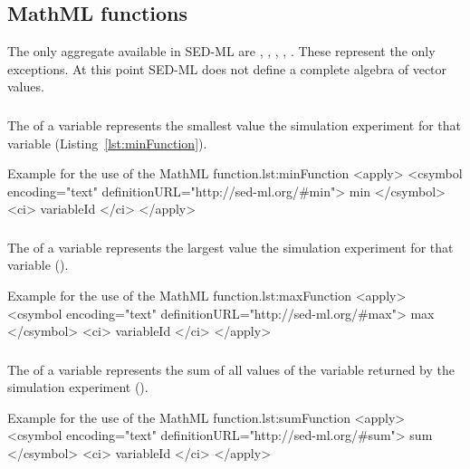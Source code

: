 \subsection{MathML functions}
The only aggregate  available in SED-ML are \sedmin, \sedmax, \sedsum, \product, . These represent the only exceptions. At this point SED-ML does not define a complete algebra of vector values.

\subsubsection*{}
\label{fun:min}
The  of a variable represents the smallest value the simulation experiment for that variable (Listing~\ref{lst:minFunction}). 
\begin{myXmlLst}{Example for the use of the MathML  function.}{lst:minFunction}
<apply>
 	<csymbol encoding="text" definitionURL="http://sed-ml.org/#min">
 		min
 	</csymbol>
 	<ci> variableId </ci>
</apply>
\end{myXmlLst}

\subsubsection*{}
\label{fun:max}
The  of a variable represents the largest value the simulation experiment for that variable ().
\begin{myXmlLst}{Example for the use of the MathML  function.}{lst:maxFunction}
<apply>
 	<csymbol encoding="text" definitionURL="http://sed-ml.org/#max">
 		max
 	</csymbol>
 	<ci> variableId </ci>
</apply>
\end{myXmlLst}

\subsubsection*{}
\label{fun:sum}
The  of a variable represents the sum of all values of the variable returned by the simulation experiment ().
\begin{myXmlLst}{Example for the use of the MathML  function.}{lst:sumFunction}
<apply>
 	<csymbol encoding="text" definitionURL="http://sed-ml.org/#sum">
 		sum
 	</csymbol>
 	<ci> variableId </ci>
</apply>
\end{myXmlLst}

